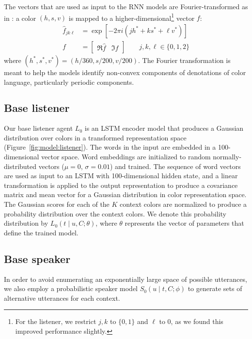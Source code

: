 \documentclass[11pt,letterpaper]{article}
\newcommand{\Listener}{L}
\newcommand{\Speaker}{S}
\newcommand{\utt}{u}
\newcommand{\context}{C}
\newcommand{\contextlen}{K}
\newcommand{\target}{t}
\newcommand{\feat}{f}
\renewcommand{\|}{\mid}
\newcommand{\figref}[1]{Figure~\ref{#1}}
\begin{document}
The vectors that are used as input to the RNN models are Fourier-transformed as in :
a color
$(h, s, v)$ is mapped to a higher-dimensional\footnote{For the listener, we restrict $j,k$ to $\{0, 1\}$ and $\ell$ to 0, as we
found this improved performance slightly.} vector $\feat$:
\begin{align*}
\hat{\feat}_{jk\ell} &= \exp \left[-2\pi i \left(jh^* + ks^* + \ell v^*\right)\right] \\
\feat &= \begin{bmatrix}
  \Re{\hat{\feat}} & \Im{\hat{\feat}}
\end{bmatrix}\qquad j,k,\ell \in \{0,1,2\} 
\end{align*}
where $(h^*, s^*, v^*) = (h / 360, s / 200, v/200)$.
The Fourier transformation is meant to help the models identify non-convex components
of denotations of color language, particularly periodic components.

\subsection{Base listener}

Our base listener agent $\Listener_0$ is an LSTM encoder model that produces a Gaussian
distribution over colors in a transformed representation space (\figref{fig:model:listener}).
The words in the input are embedded in a 100-dimensional vector space. Word embeddings
are initialized to random normally-distributed vectors ($\mu = 0$, $\sigma = 0.01$)
and trained. The sequence of word vectors are
used as input to an LSTM with 100-dimensional hidden state, and a linear
transformation is applied to the output representation to produce a covariance matrix
and mean vector for a Gaussian distribution in color representation space. 
The Gaussian scores for each of the $\contextlen$ context colors are normalized to
produce a probability distribution over the context colors. We denote this probability
distribution by $\Listener_0(\target \| \utt, \context; \theta)$, where $\theta$ represents the
vector of parameters that define the trained model.

\subsection{Base speaker}\label{sec:s0}

In order to avoid enumerating an exponentially large space of possible utterances,
we also employ a probabilistic speaker model
$\Speaker_0(\utt \| \target, \context; \phi)$ to generate sets of alternative
utterances for each context.
\end{document}
